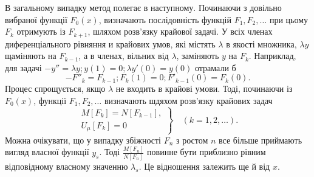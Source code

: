 \documentclass[12pt,a4paper]{article}
\begin{document}
В загальному випадку метод полегає в наступному. Починаючи з довільно вибраної функції $F_0(x)$, визначають послідовність функцій $F_1, F_2, \dots$ при цьому $F_k$ отримують із $F_{k+1}$, шляхом розв'язку крайової задачі. У всіх членах диференціального рівняння и крайових умов, які містять $\lambda$ в якості множника, $\lambda y$ щаміняють на $F_{k-1}$, а в членах, вільних від $\lambda$, заміняють $y$ на $F_k$. Наприклад, для задачі $- y'' = \lambda y; y(1) = 0; \lambda y'(0) = y(0)$ отрамали б
\[
	- F''_k = F_{k-1}; F_k(1) = 0; F'_{k-1}(0) = F_k(0).
\] 
Процес спрощується, якщо $\lambda$ не входить в крайові умови. Тоді, починаючи із $F_0(x)$, функції $F_1, F_2, \dots$ визначають шдяхом розв'язку крайових задач
\[
\left.
\begin{array}{l}
	M[F_k] = N[F_{k-1}],\\
	U_\mu[F_k] = 0
\end{array} \right\}
\quad
(k = 1, 2, \dots).
\]
Можна очікувати, що у випадку збіжності $F_n$ з ростом $n$ все більше приймають вигляд власної функції $y_s$. Тоді $\frac{M[F_n]}{N[F_n]}$ повинне бути приблизно рівним відповідному власному значенню $\lambda_s$. Це відношення залежить ще й від $x$.
\end{document}

